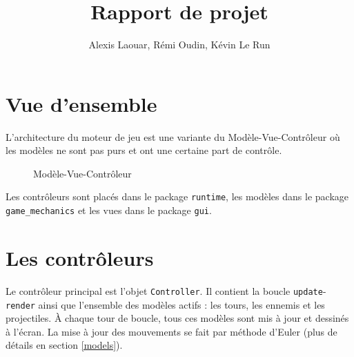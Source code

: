 \documentclass[a4paper,11pt]{article}
\begin{document}
\title{Rapport de projet}
\author{Alexis Laouar, Rémi Oudin, Kévin Le Run}
\date{}
\maketitle

\section{Vue d'ensemble}

L'architecture du moteur de jeu est une variante du Modèle-Vue-Contrôleur où les
modèles ne sont pas purs et ont une certaine part de contrôle.

\begin{figure}[h]
  \centering
  \caption{Modèle-Vue-Contrôleur}
\end{figure}

Les contrôleurs sont placés dans le package \texttt{runtime}, les modèles dans
le package \texttt{game\_mechanics} et les vues dans le package \texttt{gui}.

\section{Les contrôleurs}

Le contrôleur principal est l'objet \texttt{Controller}. Il contient la boucle
\texttt{update}-\texttt{render} ainsi que l'ensemble des modèles actifs :
les tours, les ennemis et les projectiles. À chaque tour de boucle, tous ces
modèles sont mis à jour et dessinés à l'écran. La mise à jour des mouvements se
fait par méthode d'Euler (plus de détails en section \ref{models}). \\
\end{document}
